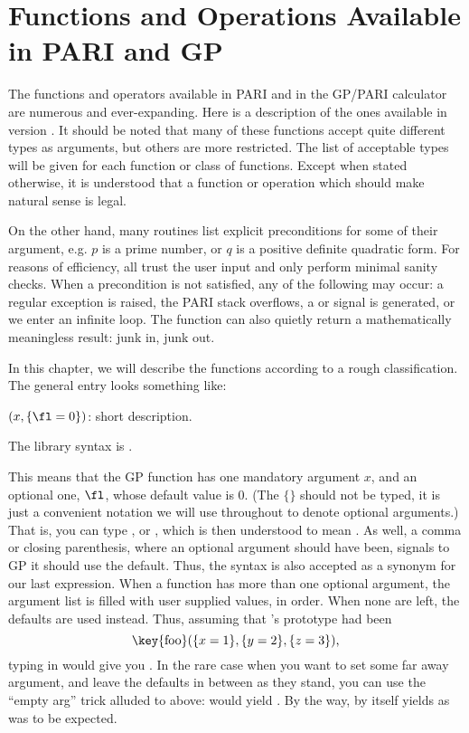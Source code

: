 %
%
\chapter{Functions and Operations Available in PARI and GP}
\label{se:functions}

The functions and operators available in PARI and in the GP/PARI calculator
are numerous and ever-expanding. Here is a description of the ones available
in version \vers. It should be noted that many of these functions accept
quite different types as arguments, but others are more restricted. The list
of acceptable types will be given for each function or class of functions.
Except when stated otherwise, it is understood that a function or operation
which should make natural sense is legal.

On the other hand, many routines list explicit preconditions for some of their
argument, e.g. $p$ is a prime number, or $q$ is a positive definite quadratic
form. For reasons of efficiency, all trust the user input and only perform
minimal sanity checks. When a precondition is not satisfied, any of the
following may occur: a regular exception is raised, the PARI stack overflows, a
 or  signal is generated, or we enter an infinite
loop. The function can also quietly return a mathematically meaningless
result: junk in, junk out.

In this chapter, we will describe the functions according to a rough
classification. The general entry looks something like:

$(x,\{\fl=0\})$: short description.

The library syntax is .

\noindent
This means that the GP function  has one mandatory argument $x$, and
an optional one, $\fl$, whose default value is 0. (The $\{\}$ should not be
typed, it is just a convenient notation we will use throughout to denote
optional arguments.) That is, you can type , or ,
which is then understood to mean . As well, a comma or closing
parenthesis, where an optional argument should have been, signals to GP it
should use the default. Thus, the syntax  is also accepted as a
synonym for our last expression. When a function has more than one optional
argument, the argument list is filled with user supplied values, in order.
When none are left, the defaults are used instead. Thus, assuming that
's prototype had been
$$\hbox{%
\key{foo}$(\{x=1\},\{y=2\},\{z=3\})$,%
}$$
typing in  would give
you . In the rare case when you want to set some far away
argument, and leave the defaults in between as they stand, you can use the
``empty arg'' trick alluded to above:  would yield
. By the way,  by itself yields
 as was to be expected.

